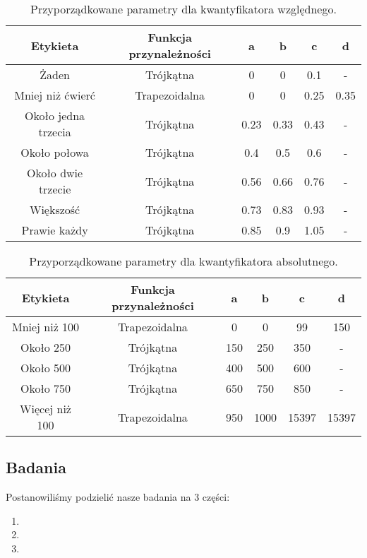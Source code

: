 \documentclass{classrep}
\begin{document}
\begin{table}[H]
	\centering
	\begin{tabular}{c c c c c c} 
		\hline
		\textbf{Etykieta} & \textbf{Funkcja przynależności} & \textbf{a} & \textbf{b} & \textbf{c} &  \textbf{d} \\ [0.5ex] 
		\hline
		\hline 
		Żaden & Trójkątna & 0 & 0 & 0.1 & - \\ 
		Mniej niż ćwierć & Trapezoidalna & 0 & 0 & 0.25 & 0.35 \\
		Około jedna trzecia & Trójkątna & 0.23 & 0.33 & 0.43 & - \\
		Około połowa & Trójkątna & 0.4 & 0.5 & 0.6 & - \\
		Około dwie trzecie & Trójkątna & 0.56 & 0.66 & 0.76 & - \\
		Większość & Trójkątna & 0.73 & 0.83 & 0.93 & - \\
		Prawie każdy & Trójkątna & 0.85 & 0.9 & 1.05 & - \\
		\hline
	\end{tabular}
	\caption{Przyporządkowane parametry dla kwantyfikatora względnego.}
\end{table}
\begin{table}[H]
	\centering
	\begin{tabular}{c c c c c c} 
		\hline
		\textbf{Etykieta} & \textbf{Funkcja przynależności} & \textbf{a} & \textbf{b} & \textbf{c} &  \textbf{d} \\ [0.5ex] 
		\hline
		\hline 
		Mniej niż 100 & Trapezoidalna & 0 & 0 & 99 & 150 \\ 
		Około 250 & Trójkątna & 150 & 250 & 350 & - \\
		Około 500 & Trójkątna & 400 & 500 & 600 & - \\
		Około 750 & Trójkątna & 650 & 750 & 850 & - \\
		Więcej niż 100 & Trapezoidalna & 950 & 1000 & 15397 & 15397 \\
		\hline
	\end{tabular}
	\caption{Przyporządkowane parametry dla kwantyfikatora absolutnego.}
\end{table}

\subsection{Badania}
Postanowiliśmy podzielić nasze badania na 3 części:
\begin{enumerate}
\item 
\item
\item
\end{enumerate}
\end{document}
